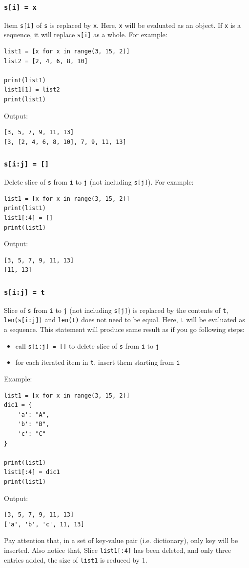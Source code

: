 \documentclass[12pt]{book}
\begin{document}
\subsubsection{\texttt{s[i] = x}}
\label{sec:orge623127}
Item \texttt{s[i]} of \texttt{s} is replaced by \texttt{x}. Here, \texttt{x} will be evaluated as an object. If \texttt{x} is a sequence, it will replace \texttt{s[i]} as a whole. For example:
\begin{verbatim}
list1 = [x for x in range(3, 15, 2)]
list2 = [2, 4, 6, 8, 10]

print(list1)
list1[1] = list2
print(list1)
\end{verbatim}
Output:
\begin{verbatim}
[3, 5, 7, 9, 11, 13]
[3, [2, 4, 6, 8, 10], 7, 9, 11, 13]
\end{verbatim}
\subsubsection{\texttt{s[i:j] = []}}
\label{sec:orge763890}
Delete slice of \texttt{s} from \texttt{i} to \texttt{j} (not including \texttt{s[j]}). For example:
\begin{verbatim}
list1 = [x for x in range(3, 15, 2)]
print(list1)
list1[:4] = []
print(list1)
\end{verbatim}
Output:
\begin{verbatim}
[3, 5, 7, 9, 11, 13]
[11, 13]
\end{verbatim}
\subsubsection{\texttt{s[i:j] = t}}
\label{sec:org283f822}
Slice of \texttt{s} from \texttt{i} to \texttt{j} (not including \texttt{s[j]}) is replaced by the contents of \texttt{t}, \texttt{len(s[i:j])} and \texttt{len(t)} does not need to be equal. Here, \texttt{t} will be evaluated as a sequence. This statement will produce same result as if you go following steps:
\begin{itemize}
\item call \texttt{s[i:j] = []} to delete slice of \texttt{s} from \texttt{i} to \texttt{j}
\item for each iterated item in \texttt{t}, insert them starting from \texttt{i}
\end{itemize}

Example:
\begin{verbatim}
list1 = [x for x in range(3, 15, 2)]
dic1 = {
    'a': "A",
    'b': "B",
    'c': "C"
}

print(list1)
list1[:4] = dic1
print(list1)
\end{verbatim}
Output:
\begin{verbatim}
[3, 5, 7, 9, 11, 13]
['a', 'b', 'c', 11, 13]
\end{verbatim}
Pay attention that, in a set of key-value pair (i.e. dictionary), only key will be inserted. Also notice that, Slice \texttt{list1[:4]} has been deleted, and only three entries added, the size of \texttt{list1} is reduced by 1.
\end{document}
